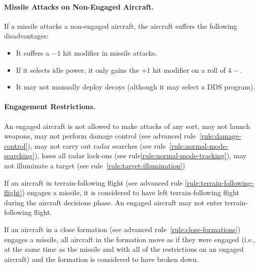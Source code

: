 {\paragraph{Missile Attacks on Non-Engaged Aircraft.} If a missile attacks a non-engaged aircraft, the aircraft suffers the following disadvantages:

\begin{itemize}

    \item It suffers a $-1$ hit modifier in missile attacks.

    \item If it selects idle power, it only gains the $+1$ hit modifier on a roll of $4-$. 
    
    \item It may not manually deploy decoys (although it may select a DDS program).
    
\end{itemize}


\paragraph{Engagement Restrictions.} An engaged aircraft is not allowed to make attacks of any sort, may not launch weapons, may not perform damage control (see advanced rule~\ref{rule:damage-control}), may not carry out radar searches (see rule~\ref{rule:normal-mode-searching}), loses all radar lock-ons (see rule\ref{rule:normal-mode-tracking}), may not illuminate a target (see rule~\ref{rule:target-illumination})

If an aircraft in terrain-following flight (see advanced rule \ref{rule:terrain-following-flight}) engages a missile, it is considered to have left terrain-following flight during the aircraft decisions phase. An engaged aircraft may not enter terrain-following flight.

If an aircraft in a close formation (see advanced rule~\ref{rule:close-formations}) engages a missile, all aircraft in the formation move as if they were engaged (i.e., at the same time as the missile and with all of the restrictions on an engaged aircraft) and the formation is considered to have broken down.

}

